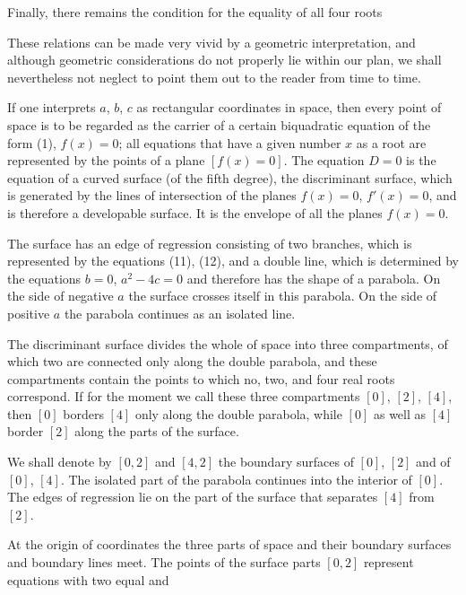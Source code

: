 
Finally, there remains the condition for the equality of all four roots

These relations can be made very vivid by a geometric interpretation, and although geometric considerations do not properly lie within our plan, we shall nevertheless not neglect to point them out to the reader from time to time.

If one interprets $a$, $b$, $c$ as rectangular coordinates in space, then every point of space is to be regarded as the carrier of a certain biquadratic equation of the form (1), $f(x) = 0$; all equations that have a given number $x$ as a root are represented by the points of a plane $[f(x) = 0]$. The equation $D = 0$ is the equation of a curved surface (of the fifth degree), the discriminant surface, which is generated by the lines of intersection of the planes $f(x) = 0$, $f'(x) = 0$, and is therefore a developable surface. It is the envelope of all the planes $f(x) = 0$.

The surface has an edge of regression consisting of two branches, which is represented by the equations (11), (12), and a double line, which is determined by the equations $b = 0$, $a^2 - 4c = 0$ and therefore has the shape of a parabola. On the side of negative $a$ the surface crosses itself in this parabola. On the side of positive $a$ the parabola continues as an isolated line.

The discriminant surface divides the whole of space into three compartments, of which two are connected only along the double parabola, and these compartments contain the points to which no, two, and four real roots correspond. If for the moment we call these three compartments $[0]$, $[2]$, $[4]$, then $[0]$ borders $[4]$ only along the double parabola, while $[0]$ as well as $[4]$ border $[2]$ along the parts of the surface.

We shall denote by $[0, 2]$ and $[4, 2]$ the boundary surfaces of $[0]$, $[2]$ and of $[0]$, $[4]$. The isolated part of the parabola continues into the interior of $[0]$. The edges of regression lie on the part of the surface that separates $[4]$ from $[2]$.

At the origin of coordinates the three parts of space and their boundary surfaces and boundary lines meet. The points of the surface parts $[0, 2]$ represent equations with two equal and
